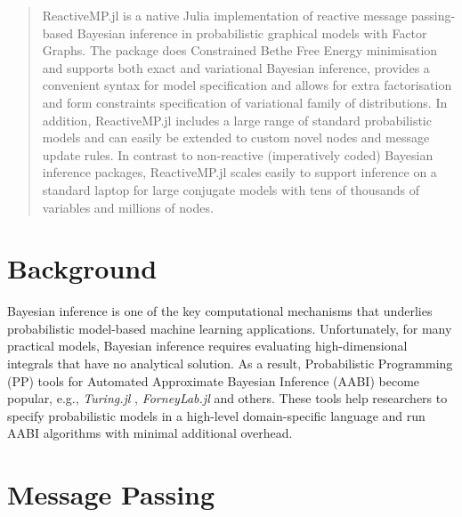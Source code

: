 \documentclass{juliacon}
\begin{document}


\maketitle

\begin{abstract}

ReactiveMP.jl is a native Julia implementation of reactive message passing-based Bayesian inference in probabilistic graphical models with Factor Graphs. 
The package does Constrained Bethe Free Energy minimisation and supports both exact and variational Bayesian inference, provides a convenient syntax for model specification and allows for extra factorisation and form constraints specification of 
variational family of distributions. In addition, ReactiveMP.jl includes a large range of standard probabilistic models and can easily be extended to custom novel nodes and message update rules. 
In contrast to non-reactive (imperatively coded) Bayesian inference packages, ReactiveMP.jl scales easily to support inference on a standard laptop 
for large conjugate models with tens of thousands of variables and millions of nodes. 

\end{abstract}

\section{Background}

Bayesian inference is one of the key computational mechanisms that underlies probabilistic model-based machine learning applications. 
Unfortunately, for many practical models, Bayesian inference requires evaluating high-dimensional integrals that have no analytical solution. 
As a result, Probabilistic Programming (PP) tools for Automated Approximate Bayesian Inference (AABI) become popular, e.g., \textit{Turing.jl} \cite{ge2018t}, 
\textit{ForneyLab.jl} \cite{ForneyLab.jl-2019} and others. These tools help researchers to specify probabilistic models in a high-level domain-specific language and 
run AABI algorithms with minimal additional overhead. 

\section{Message Passing}
\end{document}
